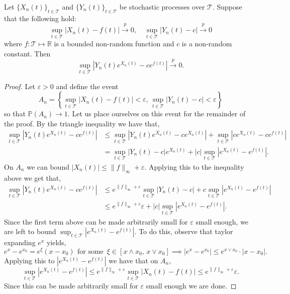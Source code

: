 \smallskip
\begin{lemma} \label{lm:von-mises-lemma}
Let $\{X_{n}(t)\}_{t\in\mathcal{T}}$ and $\{Y_{n}(t)\}_{t\in\mathcal{T}}$ be stochastic processes over $\mathcal{T}$. Suppose that the following hold:
$$\sup_{t\in\mathcal{T}}|X_{n}(t)-f(t)| \overset{p}{\to} 0, \quad \sup_{t\in\mathcal{T}}|Y_{n}(t)-c| \overset{p}{\to} 0$$
where $f:\mathcal{T}\mapsto\mathbb{R}$ is a bounded non-random function and $c$ is a non-random constant. Then
$$\sup_{t\in\mathcal{T} }|Y_{n}(t)e^{X_{n}(t)}-ce^{f(t)}| \xrightarrow{p} 0.$$
\end{lemma}
\begin{proof}
Let $\varepsilon > 0$ and define the event \[
A_n = \left\{ \sup_{t\in\mathcal{T}}|X_{n}(t)-f(t)| < \varepsilon,\, \sup_{t\in\mathcal{T}}|Y_{n}(t)-c| < \varepsilon \right\}
\]
so that $\mathbb P (A_n) \to 1$. Let us place ourselves on this event for the remainder of the proof. By the triangle inequality we have that, \begin{align*}
	\sup_{t\in\mathcal{T}}|Y_{n}(t)e^{X_{n}(t)}-ce^{f(t)}| &\le \sup_{t\in\mathcal{T}}|Y_{n}(t)e^{X_{n}(t)}-ce^{X_{n}(t)}| + \sup_{t\in\mathcal{T}}|ce^{X_{n}(t)}-ce^{f(t)}| \\
	&= \sup_{t\in\mathcal{T}}|Y_{n}(t)-c|e^{X_{n}(t)} + |c| \sup_{t\in\mathcal{T}}|e^{X_{n}(t)}-e^{f(t)}|.
\end{align*}
On $A_n$ we can bound $|X_{n}(t)| \leq \|f\|_\infty + \varepsilon$. Applying this to the inequality above we get that, \begin{align*}
	\sup_{t\in\mathcal{T}}|Y_{n}(t)e^{X_{n}(t)}-ce^{f(t)}| &\le e^{\|f\|_\infty+\varepsilon}\sup_{t\in\mathcal{T}}|Y_{n}(t)-c| + c\sup_{t\in\mathcal{T}}|e^{X_{n}(t)}-e^{f(t)}| \\
	&\le e^{\|f\|_\infty+\varepsilon}\varepsilon + |c| \sup_{t\in\mathcal{T}}|e^{X_{n}(t)}-e^{f(t)}|.
\end{align*}
Since the first term above can be made arbitrarily small for $\varepsilon$ small enough, we are left to bound $\sup_{t\in\mathcal{T}}|e^{X_{n}(t)}-e^{f(t)}|$. To do this, observe that taylor expanding $e^x$ yields, \[
e^x - e^{x_0} = e^\xi (x - x_0)\ \, \text{for some }\, \xi \in [x \wedge x_0,\, x \vee x_0] \implies |e^x - e^{x_0}| \leq e^{x \vee x_0} \cdot |x - x_0|.
\] Applying this to $|e^{X_{n}(t)}-e^{f(t)}|$ we have that on $A_n$, \[
\sup_{t\in\mathcal{T}}|e^{X_{n}(t)}-e^{f(t)}| \leq e^{\|f\|_\infty+\varepsilon} \sup_{t\in\mathcal{T}}|X_{n}(t)-f(t)| \le e^{\|f\|_\infty+\varepsilon} \varepsilon.
\] Since this can be made arbitrarily small for $\varepsilon$ small enough we are done.
\end{proof}





